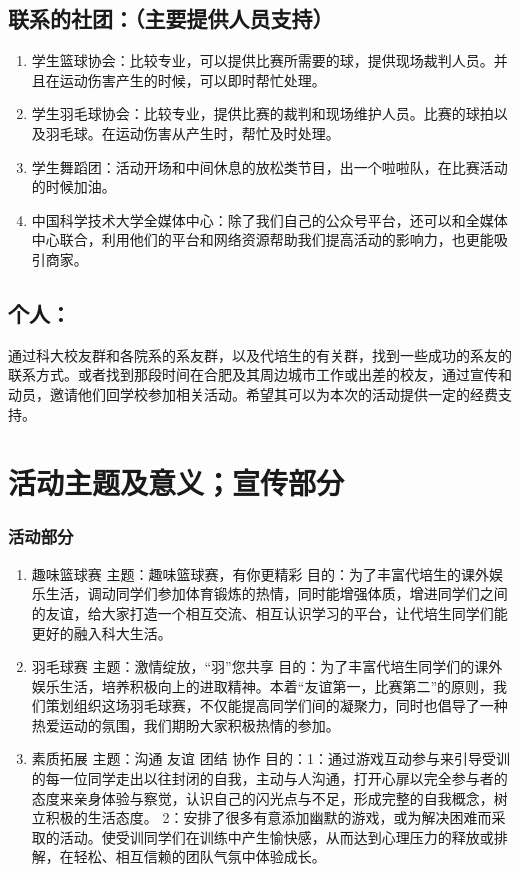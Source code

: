\documentclass{article}
\begin{document}
\begin{CJK}{UTF8}{gbsn}
\subsection{联系的社团：（主要提供人员支持）}
\begin{enumerate}
	\item 学生篮球协会：比较专业，可以提供比赛所需要的球，提供现场裁判人员。并且在运动伤害产生的时候，可以即时帮忙处理。
	\item 学生羽毛球协会：比较专业，提供比赛的裁判和现场维护人员。比赛的球拍以及羽毛球。在运动伤害从产生时，帮忙及时处理。
	\item 学生舞蹈团：活动开场和中间休息的放松类节目，出一个啦啦队，在比赛活动的时候加油。
	\item  中国科学技术大学全媒体中心：除了我们自己的公众号平台，还可以和全媒体中心联合，利用他们的平台和网络资源帮助我们提高活动的影响力，也更能吸引商家。
\end{enumerate}

\subsection{个人：}
通过科大校友群和各院系的系友群，以及代培生的有关群，找到一些成功的系友的联系方式。或者找到那段时间在合肥及其周边城市工作或出差的校友，通过宣传和动员，邀请他们回学校参加相关活动。希望其可以为本次的活动提供一定的经费支持。

\section{活动主题及意义；宣传部分}
\subsubsection{活动部分}
\begin{enumerate}
\item 趣味篮球赛
主题：趣味篮球赛，有你更精彩
目的：为了丰富代培生的课外娱乐生活，调动同学们参加体育锻炼的热情，同时能增强体质，增进同学们之间的友谊，给大家打造一个相互交流、相互认识学习的平台，让代培生同学们能更好的融入科大生活。

\item 羽毛球赛
主题：激情绽放，“羽”您共享
目的：为了丰富代培生同学们的课外娱乐生活，培养积极向上的进取精神。本着“友谊第一，比赛第二”的原则，我们策划组织这场羽毛球赛，不仅能提高同学们间的凝聚力，同时也倡导了一种热爱运动的氛围，我们期盼大家积极热情的参加。

\item 素质拓展
主题：沟通  友谊  团结  协作  
目的：1：通过游戏互动参与来引导受训的每一位同学走出以往封闭的自我，主动与人沟通，打开心扉以完全参与者的态度来亲身体验与察觉，认识自己的闪光点与不足，形成完整的自我概念，树立积极的生活态度。
2：安排了很多有意添加幽默的游戏，或为解决困难而采取的活动。使受训同学们在训练中产生愉快感，从而达到心理压力的释放或排解，在轻松、相互信赖的团队气氛中体验成长。
	

\end{enumerate}
\end{CJK}
\end{document}
